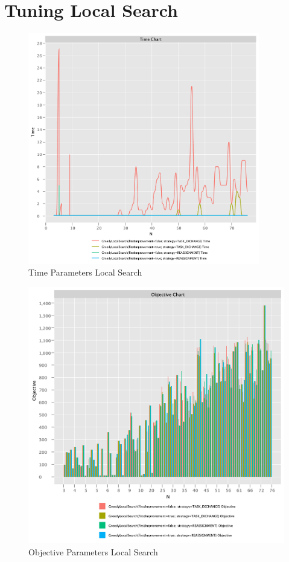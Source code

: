 \documentclass{article}
\begin{document}
\newpage

\section{Tuning Local Search}

\begin{figure}[!h]
    \centering
    \includegraphics[width=0.9\textwidth]{./documentation/assets/localSearchParams.timeChart.pdf}
    \caption{Time Parameters Local Search}
    \label{fig:local_time}
\end{figure}\FloatBarrier

\begin{figure}
    \centering
    \includegraphics[width=1\textwidth]{./documentation/assets/localSearchParams.objectiveChart.pdf}
    \caption{Objective Parameters Local Search}
    \label{fig:local_time}
\end{figure}\FloatBarrier
\end{document}
